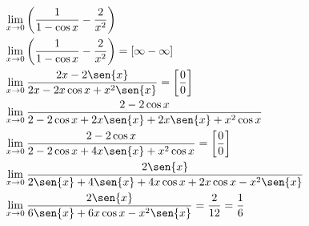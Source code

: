 \begin{ex}
\begin{align}
&\lim_{x\rightarrow 0} \left(\frac{1}{1-\cos{x}}-\frac{2}{x^2}\right)\nonumber\\
&\lim_{x\rightarrow 0} \left(\frac{1}{1-\cos{x}}-\frac{2}{x^2}\right)=[\infty-\infty]\nonumber\\
&\lim_{x\rightarrow 0} \frac{2x-2\sen{x}}{2x-2x\cos{x}+x^2\sen{x}}=\left[\frac{0}{0}\right]\nonumber\\
&\lim_{x\rightarrow 0} \frac{2-2\cos{x}}{2-2\cos{x}+2x\sen{x}+2x\sen{x}+x^2\cos{x}}\nonumber\\
&\lim_{x\rightarrow 0} \frac{2-2\cos{x}}{2-2\cos{x}+4x\sen{x}+x^2\cos{x}}=\left[\frac{0}{0}\right]\nonumber\\
&\lim_{x\rightarrow 0} \frac{2\sen{x}}{2\sen{x}+4\sen{x}+4x\cos{x}+2x\cos{x}-x^2\sen{x}}\nonumber\\
&\lim_{x\rightarrow 0} \frac{2\sen{x}}{6\sen{x}+6x\cos{x}-x^2\sen{x}}=\frac{2}{12}=\frac{1}{6}\nonumber
\end{align}
\end{ex}